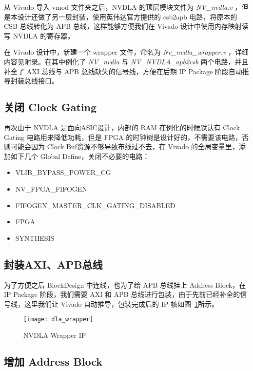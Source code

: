 从 Vivado 导入 vmod 文件夹之后，NVDLA 的顶层模块文件为 \emph{NV\_nvdla.v} ，但是本设计还做了另一层封装，使用英伟达官方提供的 csb2apb 电路，将原本的 CSB 总线转化为 APB 总线，这样能够方便我们在 Vivado 设计中使用内存映射读写 NVDLA 的寄存器。

在 Vivado 设计中，新建一个 wrapper 文件，命名为 \emph{Nv\_nvdla\_wrapper.v} ，详细内容见附录。在其中例化了 \emph{NV\_nvdla} 与 \emph{NV\_NVDLA\_apb2csb} 两个电路，并且补全了 AXI 总线与 APB 总线缺失的信号线，方便在后期 IP Package 阶段自动推导封装总线接口。

\subsection{关闭 Clock Gating}

再次由于 NVDLA 是面向ASIC设计，内部的 RAM 在例化的时候默认有 Clock Gating 电路用来降低功耗，但是 FPGA 的时钟树是设计好的，不需要该电路，否则可能会因为 Clock Buf资源不够导致布线过不去，在 Vivado 的全局变量里，添加如下几个 Global Define，关闭不必要的电路：

\begin{itemize}
    \item VLIB\_BYPASS\_POWER\_CG
    \item NV\_FPGA\_FIFOGEN
    \item FIFOGEN\_MASTER\_CLK\_GATING\_DISABLED
    \item FPGA
    \item SYNTHESIS
\end{itemize}


\subsection{封装AXI、APB总线}

为了方便之后 BlockDesign 中连线，也为了给 APB 总线挂上 Address Block，在 IP Package 阶段，我们需要 AXI 和 APB 总线进行包装，由于先前已经补全的信号线，这里我们让 Vivado 自动推导，包装完成后的 IP 核如图~\ref{fig:NVDLA Wrapper}所示。

\begin{figure}[!htbp]
    \centering
    \texttt{[image: dla\_wrapper]}
    \caption{NVDLA Wrapper IP}
    \label{fig:NVDLA Wrapper}
\end{figure}

\subsection{增加 Address Block}

